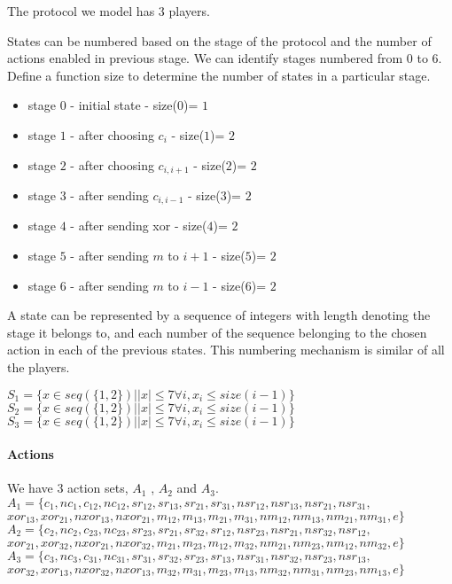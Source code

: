 The protocol we model has $3$ players.

States can be numbered based on the stage of the protocol and the number of actions enabled in previous stage. We can identify stages numbered from $0$ to $6$. \newline Define a function size to determine the number of states in a particular stage.

\begin{itemize}
	\item stage $0$ - initial state - size($0$)= $1$
	\item stage $1$ - after choosing $c_i$ - size($1$)= $2$
	\item stage $2$ - after choosing $c_{i,i+1}$ - size($2$)= $2$
	\item stage $3$ - after sending $c_{i,i-1}$ - size($3$)= $2$
	\item stage $4$ - after sending xor - size($4$)= $2$
	\item stage $5$ - after sending $m$ to $i+1$ - size($5$)= $2$
	\item stage $6$ - after sending $m$ to $i-1$ - size($6$)= $2$
\end{itemize}

A state can be represented by a sequence of integers with length denoting the stage it belongs to, 
and each number of the sequence belonging to the chosen action in each of the previous states.
This numbering mechanism is similar of all the players.

$S_1=\{ x \in seq(\{1,2\}) \vert |x| \le 7 \forall i , x_i \le size(i-1)  \}$\newline
$S_2=\{ x \in seq(\{1,2\}) \vert |x| \le 7 \forall i , x_i \le size(i-1)  \}$\newline
$S_3=\{ x \in seq(\{1,2\}) \vert |x| \le 7 \forall i , x_i \le size(i-1)  \}$\newline


\paragraph{Actions}
We have $3$ action sets, $A_1$ , $A_2$ and $A_3$.\newline
$A_1 = \{ c_1,nc_1, c_{12}, nc_{12},  sr_{12}, sr_{13}, sr_{21}, sr_{31}, nsr_{12}, nsr_{13}, nsr_{21}, nsr_{31}, $ \newline $xor_{13},xor_{21}, nxor_{13},nxor_{21},$\newline $ m_{12}, m_{13},m_{21},m_{31},  nm_{12}, nm_{13},nm_{21},nm_{31}, e\}$
\newline
$A_2 = \{ c_2,nc_2, c_{23}, nc_{23},  sr_{23}, sr_{21}, sr_{32}, sr_{12}, nsr_{23}, nsr_{21}, nsr_{32}, nsr_{12}, $ \newline $
xor_{21},xor_{32}, nxor_{21},nxor_{32},$\newline $m_{21}, m_{23},m_{12},m_{32}, nm_{21}, nm_{23},nm_{12},nm_{32},
e\}$
\newline
$A_3 = \{ c_3,nc_3, c_{31}, nc_{31},  sr_{31}, sr_{32}, sr_{23}, sr_{13}, nsr_{31}, nsr_{32}, nsr_{23}, nsr_{13}, $\newline$
xor_{32},xor_{13}, nxor_{32},nxor_{13},$\newline $m_{32}, m_{31},m_{23},m_{13}, nm_{32}, nm_{31},nm_{23},nm_{13},
e\}$

